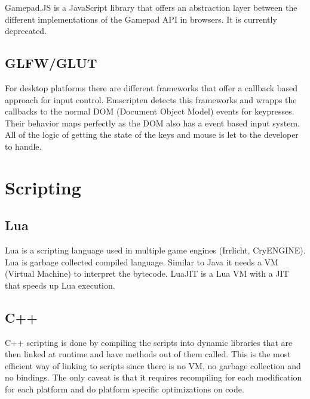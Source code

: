 Gamepad.JS is a JavaScript library that offers an abstraction layer between the different implementations of the Gamepad API in browsers. It is currently deprecated.

\subsection{GLFW/GLUT}

For desktop platforms there are different frameworks that offer a callback based approach for input control. Emscripten detects this frameworks and wrapps the callbacks to the normal DOM (Document Object Model) events for keypresses. Their behavior maps perfectly as the DOM also has a event based input system. All of the logic of getting the state of the keys and mouse is let to the developer to handle.

\section{Scripting}

\subsection{Lua}

Lua is a scripting language used in multiple game engines (Irrlicht, CryENGINE). Lua is garbage collected compiled language. Similar to Java it needs a VM (Virtual Machine) to interpret the bytecode. LuaJIT is a Lua VM with a JIT that speeds up Lua execution.

\subsection{C++}

C++ scripting is done by compiling the scripts into dynamic libraries that are then linked at runtime and have methods out of them called. This is the most efficient way of linking to scripts since there is no VM, no garbage collection and no bindings. The only caveat is that it requires recompiling for each modification for each platform and do platform specific optimizations on code.
	



